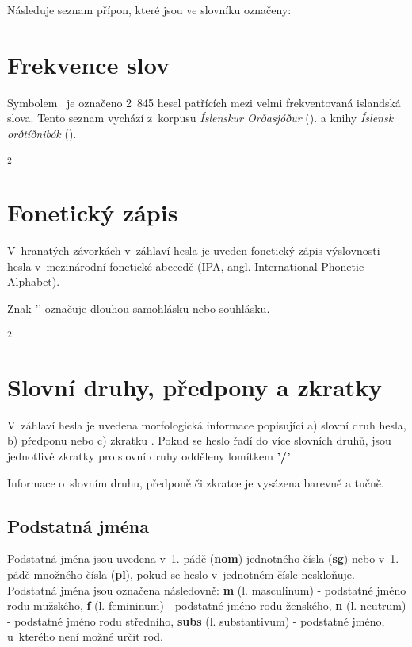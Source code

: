 Následuje seznam přípon, které jsou ve slovníku označeny:

\tableA

\section{Frekvence slov}

Symbolem \dicsymFrequent\ je označeno 2~845 hesel patřících mezi velmi frekventovaná islandská slova. Tento seznam vychází z~korpusu \textit{Íslenskur Orðasjóður} (\cite{int7}). a knihy \textit{Íslensk orðtíðnibók} (\cite{is2}).

\blspace
  \dicEntry {}\textsuperscript{2} \dicsymFrequent
\blspace

\section{Fonetický zápis}

V~hranatých závorkách v~záhlaví hesla je uveden fonetický zápis výslovnosti hesla v~mezinárodní fonetické abecedě (IPA, angl. International Phonetic Alphabet).

\blspace
  \dicEntry {} 
\blspace

Znak '{\textlengthmark}' označuje dlouhou samohlásku nebo souhlásku.

\blspace
  \dicEntry {}\textsuperscript{2} 
\blspace

\section{Slovní druhy, předpony a zkratky}

V~záhlaví hesla je uvedena morfologická informace popisující a) slovní druh hesla, b) předponu nebo c) zkratku . Pokud se heslo řadí do více slovních druhů, jsou jednotlivé zkratky pro slovní druhy odděleny lomítkem \textbf{'/'}.

\blspace
  \dicEntry {} 
\blspace

Informace o~slovním druhu, předponě či zkratce je vysázena barevně a tučně.

\subsection*{Podstatná jména}

Podstatná jména jsou uvedena v~1. pádě (\textbf{nom}) jednotného čísla (\textbf{sg}) nebo v~1. pádě množného čísla (\textbf{pl}), pokud se heslo v~jednotném čísle neskloňuje. Podstatná jména jsou označena následovně: \textbf{m} (l. masculinum) - podstatné jméno rodu mužského,
\textbf{f} (l. femininum) - podstatné jméno rodu ženského, \textbf{n} (l. neutrum) - podstatné jméno rodu středního, \textbf{subs} (l. substantivum) - podstatné jméno, u~kterého není možné určit rod.

